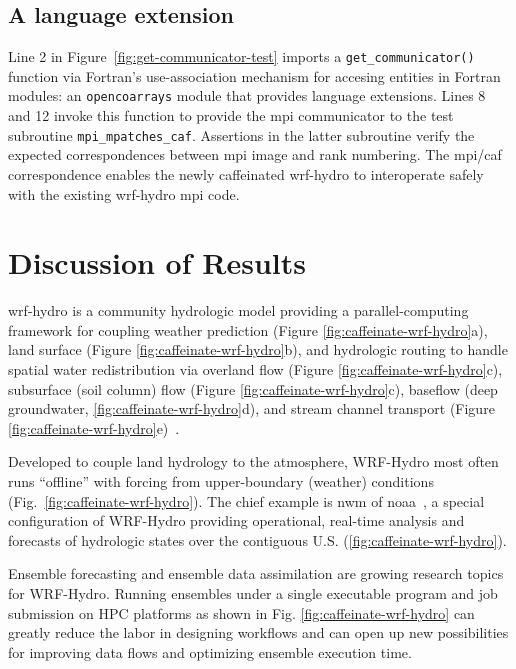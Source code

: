 \subsection{A language extension}
Line 2 in Figure~\ref{fig:get-communicator-test} imports a \texttt{get\_communicator()} function via Fortran's
use-association mechanism for accesing entities in Fortran modules: an \texttt{opencoarrays} module that
provides language extensions.  Lines 8 and 12 invoke this function
to provide the \gls{mpi} communicator to the test subroutine \texttt{mpi\_mpatches\_caf}.  Assertions in the
latter subroutine verify the expected correspondences between \gls{mpi} image and rank numbering.
The \gls{mpi}/\gls{caf} correspondence enables the newly caffeinated \gls{wrf-hydro}
to interoperate safely with the existing \gls{wrf-hydro} \gls{mpi} code.

\section{Discussion of Results}\label{sec:discussion}
\gls{wrf-hydro} is a community hydrologic model providing a parallel-computing
framework for coupling weather prediction (Figure \ref{fig:caffeinate-wrf-hydro}a), land surface
(Figure \ref{fig:caffeinate-wrf-hydro}b), and hydrologic routing to handle spatial water redistribution
via overland flow (Figure \ref{fig:caffeinate-wrf-hydro}c), subsurface (soil column) flow (Figure \ref{fig:caffeinate-wrf-hydro}c),
baseflow (deep groundwater, \ref{fig:caffeinate-wrf-hydro}d), and stream channel transport
(Figure \ref{fig:caffeinate-wrf-hydro}e)~\cite{gochisEtal2014}.

Developed to couple land hydrology to the atmosphere,
WRF-Hydro most often runs ``offline'' with
forcing from upper-boundary (weather) conditions (Fig.~\ref{fig:caffeinate-wrf-hydro}).
The chief example is \gls{nwm} of \gls{noaa}~\cite{noaa2016}, a  special
configuration of WRF-Hydro providing operational, real-time analysis and forecasts of
hydrologic states over the contiguous U.S. (\ref{fig:caffeinate-wrf-hydro}).

Ensemble forecasting and ensemble data assimilation are
growing research topics for WRF-Hydro. Running ensembles under a
single executable program and job submission on HPC platforms as shown in
Fig. \ref{fig:caffeinate-wrf-hydro} can greatly reduce the
labor in designing workflows and can open up new
possibilities for improving data flows and optimizing ensemble
execution time.

